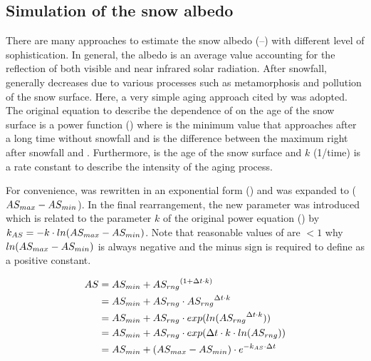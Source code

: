 
\subsection{Simulation of the snow albedo} \label{sec:snow-enBal_albedo}

There are many approaches to estimate the snow albedo \snowAlbedo{} (--) with different level of sophistication. In general, the albedo is an average value accounting for the reflection of both visible and near infrared solar radiation. After snowfall, \snowAlbedo{} generally decreases due to various processes such as metamorphosis and pollution of the snow surface. Here, a very simple aging approach cited by \citet{Dyck1995} was adopted. The original equation to describe the dependence of \snowAlbedo{} on the age of the snow surface \citep[Equation 10.40 in][]{Dyck1995} is a power function () where \snowAlbedoMin{} is the minimum value that \snowAlbedo{} approaches after a long time without snowfall and \snowAlbedoRng{} is the difference between the maximum \snowAlbedo{} right after snowfall and \snowAlbedoMin{}. Furthermore, \deltat{} is the age of the snow surface and $k$ (1/time) is a rate constant to describe the intensity of the aging process.

For convenience,  was rewritten in an exponential form () and \snowAlbedoRng{} was expanded to ($AS_{max}{}-AS_{min}{}$). In the final rearrangement, the new parameter \snowAlbedoDecrConst{} was introduced which is related to the parameter $k$ of the original power equation () by $k_{AS} = -k \cdot ln(AS_{max}-AS_{min})$. Note that reasonable values of \snowAlbedo{} are $<1$ why $ln(AS_{max}-AS_{min})$ is always negative and the minus sign is required to define \snowAlbedoDecrConst{} as a positive constant.

\begin{align}
  AS & = AS_{min} + {AS_{rng}} ^{(1+\Delta t \cdot k)} \label{eqn:snow-enBal_albedo-powfunc} \\
    & = AS_{min} + AS_{rng} \cdot {\ensuremath{AS_{rng}}} ^{\Delta t \cdot k} \nonumber \\
    & = AS_{min} + AS_{rng} \cdot exp(ln({AS_{rng}} ^{\Delta t \cdot k})) \nonumber \\
    & = AS_{min} + AS_{rng} \cdot exp(\Delta t \cdot k \cdot ln(AS_{rng})) \nonumber \\
    & = AS_{min} + (AS_{max}-AS_{min}) \cdot e^{-k_{AS} \cdot \Delta t} \label{eqn:snow-enBal_albedo-expfunc}
\end{align}

